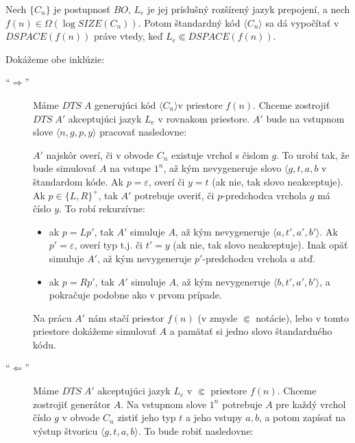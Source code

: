 {\begin{lema}
Nech $\{ C_n\}$ je postupnosť $BO$, $L_e$ je jej príslušný
rozšírený jazyk prepojení, a nech $f(n)\in\Omega(\log SIZE(C_n))$.
Potom štandardný kód $\langle C_n\rangle$ sa dá vypočítať v
$DSPACE(f(n))$ práve vtedy, keď $L_e\Subset DSPACE(f(n))$.
\end{lema}

\begin{dokaz}
Dokážeme obe inklúzie:
\begin{description}
  \item[``$\Rightarrow$''] Máme $DTS\; A$ generujúci kód $\langle
  C_n\rangle$v priestore $f(n)$. Chceme zostrojiť $DTS\; A'$
  akceptujúci jazyk $L_e$ v rovnakom priestore. $A'$ bude na
  vstupnom slove $\langle n,g,p,y\rangle$ pracovať nasledovne:

  $A'$ najskôr overí, či v obvode $C_n$ existuje vrchol s čislom
  $g$. To urobí tak, že bude simulovať $A$ na vstupe $1^n$, až kým
  nevygeneruje slovo $\langle g,t,a,b$ v štandardom kóde. Ak
  $p=\varepsilon$, overí či $y=t$ (ak nie, tak slovo neakceptuje).
  Ak $p\in\{ L,R\}^+$, tak $A'$ potrebuje overiť, či
  $p$-predchodca vrchola $g$ má číslo $y$. To robí rekurzívne:
  \begin{itemize}
    \item ak $p=Lp'$, tak $A'$ simuluje $A$, až kým nevygeneruje
    $\langle a,t',a',b'\rangle$. Ak $p'=\varepsilon$, overí typ t.j.
    či $t'=y$ (ak nie, tak slovo neakceptuje). Inak opäť simuluje
    $A'$, až kým nevygeneruje $p'$-predchodcu vrchola $a$ atď.
    \item ak $p=Rp'$, tak $A'$ simuluje $A$, až kým
    nevygeneruje $\langle b,t',a',b'\rangle$, a pokračuje podobne
    ako v prvom prípade.
  \end{itemize}
  Na prácu $A'$ nám stačí priestor $f(n)$ (v zmysle $\Subset$ notácie),
  lebo v tomto priestore dokážeme simulovať $A$ a pamätať si jedno
  slovo štandardného kódu.
  \item[``$\Leftarrow$''] Máme $DTS\;A'$ akceptujúci jazyk $L_e$ v
  $\Subset$ priestore $f(n)$. Chceme zostrojiť generátor $A$. Na
  vstupnom slove $1^n$ potrebuje $A$ pre každý vrchol číslo $g$ v
  obvode $C_n$ zistiť jeho typ $t$ a jeho vstupy $a,b$, a potom
  zapísať na výstup štvoricu $\langle g,t,a,b\rangle$. To bude
  robiť nasledovne:


\end{description}
\end{dokaz}}
